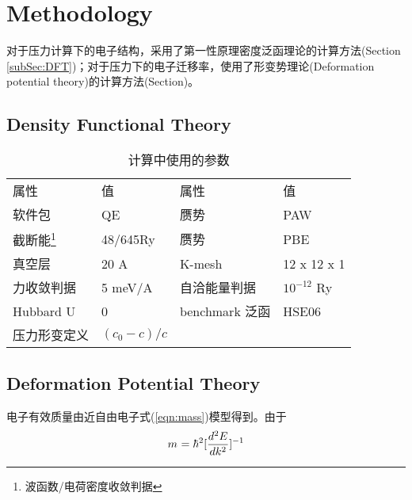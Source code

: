 \documentclass[reprint, aps, prb, showkeys]{revtex4-2}
\begin{document}
\section{Methodology}
对于压力计算下的电子结构，采用了第一性原理密度泛函理论的计算方法(Section \ref{subSec:DFT})；对于压力下的电子迁移率，使用了形变势理论(Deformation potential theory)的计算方法(Section)。
\subsection{Density Functional Theory \label{subSec:DFT}}
\begin{table}[b]
    \caption{\label{Tab:DFTparameter} 计算中使用的参数} 
\begin{ruledtabular}
    \begin{tabular}{llll}
    \textrm{属性}&
    \textrm{值}&
    \textrm{属性}&
    \textrm{值}\\
    软件包          & QE        & 赝势              & PAW \\
    截断能\footnote{波函数/电荷密度收敛判据}& 48/645Ry  & 赝势              & PBE \\
    真空层          & 20 A      & K-mesh            & 12 x 12 x 1 \\
    力收敛判据      & 5 meV/A   & 自洽能量判据      & $10^{-12}$ Ry \\
    Hubbard U       & 0         & benchmark 泛函    & HSE06 \\
    压力形变定义     & $(c_0 - c)/c$ &  &  \\  
    \end{tabular}
\end{ruledtabular}
\end{table}

\subsection{Deformation Potential Theory}
电子有效质量由近自由电子式(\ref{eqn:mass})模型得到。由于
\begin{equation}
    m^{\*} = \hbar^2 [\frac{d^2E}{dk^2}]^{-1}
    \label{eqn:mass}
\end{equation}
\end{document}
